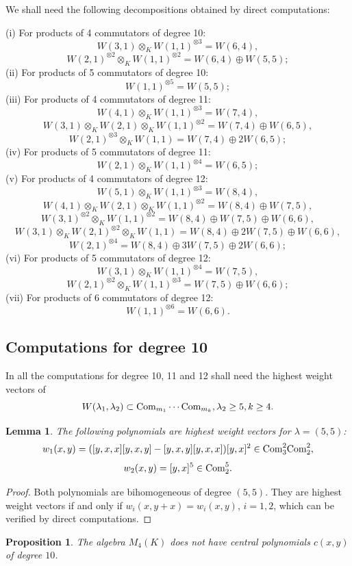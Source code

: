 \documentclass[12pt]{amsart}
\newtheorem{lemma}[theorem]{Lemma}
\newtheorem{proposition}[theorem]{Proposition}
\theoremstyle{definition}
\begin{document}
We shall need the following decompositions obtained by direct computations:

\noindent (i) For products of 4 commutators of degree 10:
\[
W(3,1)\otimes_KW(1,1)^{\otimes 3}=W(6,4),
\]
\[
W(2,1)^{\otimes 2}\otimes_KW(1,1)^{\otimes 2}=W(6,4)\oplus W(5,5);
\]
(ii) For products of 5 commutators of degree 10:
\[
W(1,1)^{\otimes 5}=W(5,5);
\]
(iii) For products of 4 commutators of degree 11:
\[
W(4,1)\otimes_KW(1,1)^{\otimes 3}=W(7,4),
\]
\[
W(3,1)\otimes_KW(2,1)\otimes_KW(1,1)^{\otimes 2}=W(7,4)\oplus W(6,5),
\]
\[
W(2,1)^{\otimes 3}\otimes_KW(1,1)=W(7,4)\oplus 2W(6,5);
\]
(iv) For products of 5 commutators of degree 11:
\[
W(2,1)\otimes_KW(1,1)^{\otimes 4}=W(6,5);
\]
(v) For products of 4 commutators of degree 12:
\[
W(5,1)\otimes_K W(1,1)^{\otimes 3}=W(8,4),
\]
\[
W(4,1)\otimes_KW(2,1)\otimes_KW(1,1)^{\otimes 2}=W(8,4)\oplus W(7,5),
\]
\[
W(3,1)^{\otimes 2}\otimes_KW(1,1)^{\otimes 2}=W(8,4)\oplus W(7,5)\oplus W(6,6),
\]
\[
W(3,1)\otimes_KW(2,1)^{\otimes 2}\otimes_KW(1,1)=W(8,4)\oplus 2W(7,5)\oplus W(6,6),
\]
\[
W(2,1)^{\otimes 4}=W(8,4)\oplus 3W(7,5)\oplus 2W(6,6);
\]
(vi) For products of 5 commutators of degree 12:
\[
W(3,1)\otimes_K W(1,1)^{\otimes 4}=W(7,5),
\]
\[
W(2,1)^{\otimes 2}\otimes_K W(1,1)^{\otimes 3}=W(7,5)\oplus W(6,6);
\]
(vii) For products of 6 commutators of degree 12:
\[
W(1,1)^{\otimes 6}=W(6,6).
\]

\subsection{Computations for degree 10}
In all the computations for degree 10, 11 and 12 shall need the highest weight vectors of
\[
W(\lambda_1,\lambda_2)\subset \text{\rm Com}_{m_1}\cdots \text{\rm Com}_{m_k}, \lambda_2\geq 5, k\geq 4.
\]

\begin{lemma}\label{HWV of degree 10}
The following polynomials are highest weight vectors for $\lambda=(5,5)$:
\[
w_1(x,y)=([y,x,x][y,x,y]-[y,x,y][y,x,x])[y,x]^2\in \text{\rm Com}_3^2\text{\rm Com}_2^2,
\]
\[
w_2(x,y)=[y,x]^5\in \text{\rm Com}_2^5.
\]
\end{lemma}

\begin{proof}
Both polynomials are bihomogeneous of degree $(5,5)$. They are highest weight vectors if and only if
$w_i(x,y+x)=w_i(x,y)$, $i=1,2$, which can be verified by direct computations.
\end{proof}

\begin{proposition}\label{no central polynomials of degree 10}
The algebra $M_4(K)$ does not have central polynomials $c(x,y)$ of degree $10$.
\end{proposition}
\end{document}
